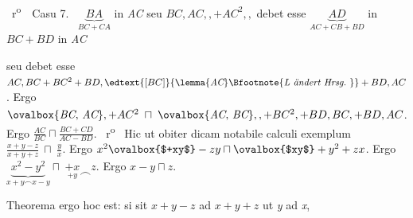 \pstart
\hspace{1mm}\hspace{-1mm}%
%
%
~r\textsuperscript{o}\rbrack\ 
\textlangle\textendash\textrangle\ Casu 7.\
%
$\underbrace{BA}_{\displaystyle BC+CA}$ in \textit{AC}
%
seu
%
$BC,AC,,+AC^2,,$
%
debet esse $\underbrace{AD}_{\displaystyle AC+CB+BD}$ in $BC + BD$ in \textit{AC} \rule[-4mm]{0mm}{8mm}seu debet esse 
%
$AC,BC+BC^2+BD,%
\edtext{\lbrack BC\rbrack}{%
\lemma{\textit{AC}}%
\Bfootnote{%
\textit{L ändert Hrsg.}\ %
}}%
+BD,AC$.%
\pend
\vspace{-0.8mm}
\pstart
%
Ergo 
%
$\ovalbox{\textit{BC},\,\textit{AC}}, + AC^2\; \sqcap\; 
\rule[0cm]{0mm}{12pt}%
\ovalbox{\textit{AC},\,\textit{BC}},, + BC^2, + BD,BC,+ BD,AC$. 
%
%
Ergo 
%
$\displaystyle\frac{AC}{BC} \sqcap \displaystyle\frac{BC+CD}{AC - BD}$.
\pend
%
\newpage
\pstart
{}~r\textsuperscript{o}\rbrack\ 
Hic ut obiter dicam notabile calculi exemplum%
\protect{}
%
$\displaystyle\frac{x+y-z}{x+y+z}\ \sqcap\ \displaystyle\frac{y}{x}$.
%
Ergo 
%
$x^2\ovalbox{$+xy$}-zy \sqcap \ovalbox{$xy$}+y^2+zx$.
%
%
Ergo
%
$\underbrace{x^2 - y^2}_{\displaystyle x+y \smallfrown x-y} \sqcap\ %
%
\underset{\displaystyle +y}{+x} 		%
\smallfrown z$.
%
Ergo
%
$x-y \sqcap z$.
%
\rule[0cm]{0mm}{12pt}%
Theorema ergo hoc est: si sit
%
$x + y - z$ ad $ x + y + z$ ut \textit{y} ad \textit{x}, 
